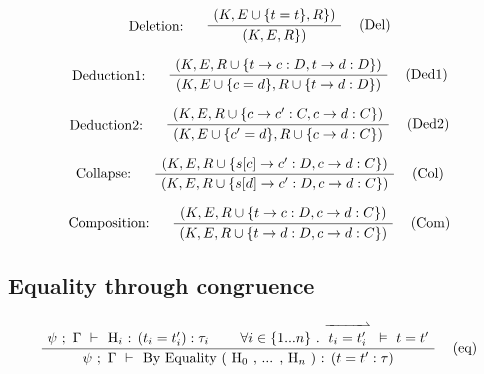 \documentclass[twoside,a4paper]{article}
\theoremstyle{definition}
\begin{document}
\[
\AxiomC{$(K,E \cup \{t = t \},R\})$}
\LeftLabel{Deletion: \quad}
\RightLabel{\quad (Del)}
\UnaryInfC{$(K,E,R\})$}
\DisplayProof
\]

\[
\AxiomC{$(K,E,R \cup \{t \rightarrow c : D , t \rightarrow d : D \})$}
\LeftLabel{Deduction1: \quad}
\RightLabel{\quad (Ded1)}
\UnaryInfC{$(K,E \cup \{c = d \},R \cup \{t \rightarrow d : D\})$}
\DisplayProof
\]

\[
\AxiomC{$(K,E,R \cup \{c \rightarrow c' : C , c \rightarrow d : C \})$}
\LeftLabel{Deduction2: \quad}
\RightLabel{\quad (Ded2)}
\UnaryInfC{$(K,E \cup \{c' = d \},R \cup \{c \rightarrow d : C\})$}
\DisplayProof
\]

\[
\AxiomC{$(K,E,R \cup \{s[c] \rightarrow c' : D , c \rightarrow d : C \})$}
\LeftLabel{Collapse: \quad}
\RightLabel{\quad (Col)}
\UnaryInfC{$(K,E,R \cup \{s[d] \rightarrow c' : D , c \rightarrow d : C \})$}
\DisplayProof
\]

\[
\AxiomC{$(K,E,R \cup \{t \rightarrow c : D , c \rightarrow d : C \})$}
\LeftLabel{Composition: \quad}
\RightLabel{\quad (Com)}
\UnaryInfC{$(K,E,R \cup \{t \rightarrow d : D , c \rightarrow d : C \})$}
\DisplayProof
\]

\subsection{Equality through congruence}

\[
\AxiomC{$\psi~ ;~ \Gamma ~\vdash~$ H$_i$ : $(t_i = t_i ') : \tau_i$}
\AxiomC{$\forall i \in \{1 ... n\}~ . ~ \overset{\xrightharpoonup{~~~~~~~~}}{t_i = t_i '} ~\vDash~ t = t'$}
\RightLabel{\quad (eq)}
\BinaryInfC{$\psi~ ;~ \Gamma ~\vdash~$ By Equality ( H$_0$ , ... , H$_n$ ) : ($t = t' : \tau$)}
\DisplayProof
\]



\end{document}
